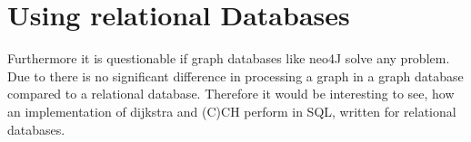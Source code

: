 \section{Using relational Databases}

Furthermore it is questionable if graph databases like neo4J solve any problem. Due to \cite[The Case Against Specialized Graph Analytics Engines]{fan2015case} there is no significant difference in processing a graph in a graph database compared to a relational 
database. Therefore it would be interesting to see, how an implementation of dijkstra and (C)CH perform in SQL, written for relational databases. 